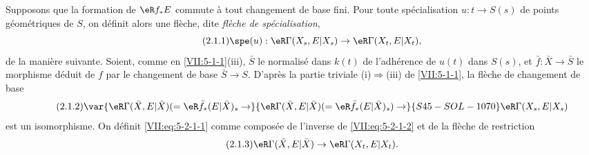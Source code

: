 Supposons que la formation de $\eR f_\ast E$ commute à tout changement de 
base fini. Pour toute spécialisation $u:t\to S(s)$ de points géométriques 
de $S$, on définit alors une flèche, dite \emph{flèche de 
spécialisation}, 
\begin{equation*}\tag{2.1.1}\label{VII:eq:5-2-1-1}
  \spe(u):\eR\Gamma(X_s,E|X_s) \to \eR\Gamma(X_t,E|X_t) \text{,}
\end{equation*}
de la manière suivante. Soient, comme en \ref{VII:5-1-1}(iii), $\bar S$ le 
normalisé dans $k(t)$ de l'adhérence de $u(t)$ dans $S(s)$, et 
$\bar f:\bar X\to \bar S$ le morphisme déduit de $f$ par le changement de 
base $\bar S\to S$. D'après la partie triviale (i)$\Rightarrow$(iii) de 
\ref{VII:5-1-1}, la flèche de changement de base
\begin{equation*}\tag{2.1.2}\label{VII:eq:5-2-1-2}
  \var{\eR\Gamma(\bar X,E|\bar X) (=\eR\bar f_\ast (E|\bar X)_s \to}{\eR\Gamma(\bar X,E|\bar X) (=\eR\bar f_\ast (E|\bar X)_s) \to}{S45-SOL-1070} \eR\Gamma(X_s,E|X_s) 
\end{equation*}
est un isomorphisme. On définit \eqref{VII:eq:5-2-1-1} comme composée de 
l'inverse de \eqref{VII:eq:5-2-1-2} et de la flèche de restriction 
\begin{equation*}\tag{2.1.3}\label{VII:eq:5-2-1-3}
  \eR\Gamma(\bar X,E|\bar X) \to \eR\Gamma(X_t,E|X_t) \text{.}
\end{equation*}





\subsubsection{}\label{VII:5-2-2}

